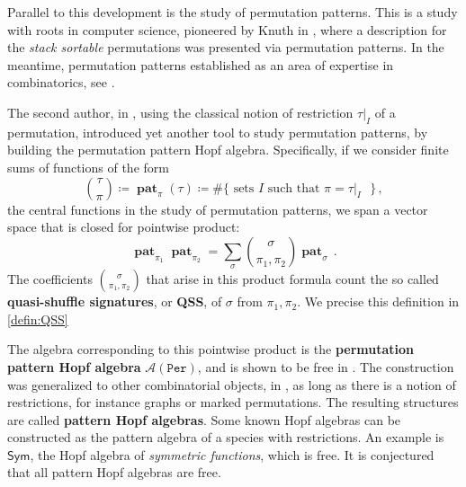 \documentclass[submission]{FPSAC2023}
\theoremstyle{definition}
\DeclareMathOperator{\pat}{\mathbf{pat}}
\begin{document}
\begin{comment}
In \cite{aguiar2017hopf}, a cancellation-free antipode formula for a Hopf structure on generalized permutahedra was found. 
This has striking consequences, because several interesting combinatorial structures can be embedded in the Hopf algebra of the generalized permutahedra.
Specific examples are graphs, matroids, posets and set partitions.
Thus, this allows us to readily determine a cancellation-free formula for all these Hopf algebras.
\end{comment}
Parallel to this development is the study of permutation patterns.
This is a study with roots in computer science, pioneered by Knuth in \cite{Knuth}, where a description for the \textit{stack sortable} permutations was presented via permutation patterns.
In the meantime, permutation patterns established as an area of expertise in combinatorics, see \cite{linton2010permutation}.

The second author, in \cite{Vargas}, using the classical notion of restriction $\tau|_I$ of a permutation, introduced yet another tool to study permutation patterns, by building the permutation pattern Hopf algebra.
Specifically, if we consider finite sums of functions of the form 
$$ \binom{\tau}{\pi} \coloneqq \pat_{\pi}(\tau)\coloneqq  \#\{\text{ sets $I$ such that $\pi= \tau|_I$ }\}\, ,$$
the central functions in the study of permutation patterns, we span a vector space that is closed for pointwise product:
\begin{equation}\label{eq:prodperm}
\pat_{\pi_1} \pat_{\pi_2} = \sum_{\sigma} \binom{\sigma}{\pi_1, \pi_2} \pat_{\sigma} \, .
\end{equation}
The coefficients $\binom{\sigma}{\pi_1, \pi_2}$ that arise in this product formula count the so called \textbf{quasi-shuffle signatures}, or \textbf{QSS}, of $\sigma$ from $\pi_1, \pi_2$.
We precise this definition in \cref{defin:QSS}

The algebra corresponding to this pointwise product is the \textbf{permutation pattern Hopf algebra} $\mathcal{A}(\mathtt{Per})$, and is shown to be free in \cite{Vargas}. The construction was generalized to other combinatorial objects, in \cite{Penaguiao2020}, as long as there is a notion of restrictions, for instance graphs or marked permutations.
The resulting structures are called \textbf{pattern Hopf algebras}. Some known Hopf algebras can be constructed as the pattern algebra of a species with restrictions.
An example is $\mathsf{Sym}$, the Hopf algebra of \textit{symmetric functions}, which is free.
It is conjectured that all pattern Hopf algebras are free.
\end{document}
